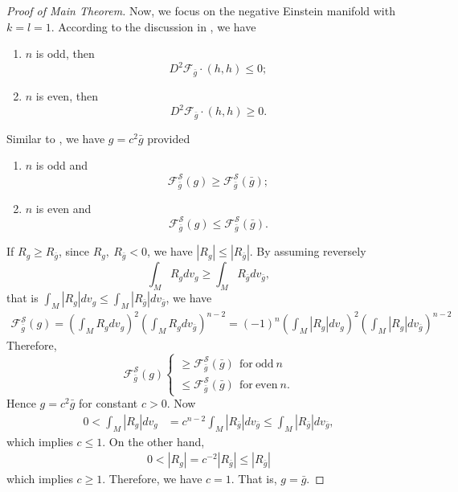 \documentclass[12pt]{amsart}
\newcommand{\bg}{\bar{g}}
\numberwithin{equation}{section}
\begin{document}
\begin{proof}[Proof of Main Theorem]
    Now, we focus on the negative Einstein manifold with $k=l=1$. According to the discussion in , we have
    \begin{enumerate}
        \item $n$ is odd, then
        \begin{equation*}
        D^2\mathcal{F}_{\bg}\cdot(h,h) \leq 0;
        \end{equation*}
    \item $n$ is even, then
        \begin{equation*}
            D^2\mathcal{F}_{\bg}\cdot(h,h) \geq 0.
        \end{equation*}
    \end{enumerate}
    Similar to , we have $g=c^2\bg$ provided
    \begin{enumerate}
        \item $n$ is odd and
        \begin{equation*}
        \mathcal{F}_{{\bg}}^{\mathcal{S}}(g)\geq\mathcal{F}_{{\bg}}^{\mathcal{S}}(\bg);
        \end{equation*}
    \item $n$ is even and
        \begin{equation*}
            \mathcal{F}_{{\bg}}^{\mathcal{S}}(g)\leq\mathcal{F}_{{\bg}}^{\mathcal{S}}(\bg).
        \end{equation*}
    \end{enumerate}
    If $R_g\geq R_{\bg}$, since $R_g,\ R_{\bg}<0$, we have $|R_g|\leq |R_{\bg}|$. By assuming reversely
    \begin{equation*}
        \int_MR_gdv_g\geq\int_MR_{\bg}dv_{\bg},
    \end{equation*}
    that is $\int_M|R_g|dv_g\leq\int_M|R_{\bg}|dv_{\bg}$, we have
    \begin{align*}
        \mathcal{F}_{\bg}^{\mathcal{S}}(g)=\left(\int_MR_gdv_g\right)^{2}\left(\int_MR_gdv_{\bg}\right)^{n-2}=(-1)^n\left(\int_M|R_g|dv_g\right)^{2}\left(\int_M|R_g|dv_{\bg}\right)^{n-2}
    \end{align*}
    Therefore,
    \begin{equation*}
        \mathcal{F}_{\bg}^{\mathcal{S}}(g)
        \begin{cases}
            \geq\mathcal{F}_{\bg}^{\mathcal{S}}(\bg)\ \  \mathrm{for\ odd}\ n \\
            \leq\mathcal{F}_{\bg}^{\mathcal{S}}(\bg)\ \  \mathrm{for\ even}\ n.
        \end{cases}
    \end{equation*}
    Hence $g=c^2\bg$ for constant $c>0$. Now
    \begin{align*}
        0<\int_M|R_g|dv_g &= c^{n-2}\int_M|R_{\bg}|dv_{\bg} \leq\int_M|R_{\bg}|dv_{\bg},
    \end{align*}
    which implies $c\leq1$. On the other hand,
    \begin{align*}
        0<|R_g|=c^{-2}|R_{\bg}|\leq |R_{\bg}|
    \end{align*}
    which implies $c\geq1$. Therefore, we have $c=1$. That is, $g=\bg$.
    
\end{proof}
\end{document}
